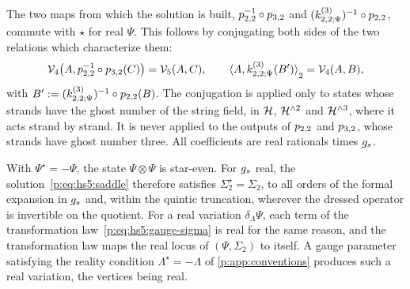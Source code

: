 The two maps from which the solution is built, $p_{2,2}^{-1} \circ p_{3,2}$ and $(\kin{2}{\Psi}{3})^{-1} \circ \sprod{2}{2}$, commute with $\star$ for real $\Psi$.
This follows by conjugating both sides of the two relations which characterize them:
\begin{equation}
\vertex{4}\big( A, \sprod{2}{2}^{-1} \circ \sprod{3}{2}(C) \big)
  = \vertex{5}(A, C),
\qquad
\pair[2]{A}{\kin{2}{\Psi}{3}(B')}
  = \vertex{4}(A, B),
\end{equation}
with $B' := (\kin{2}{\Psi}{3})^{-1} \circ \sprod{2}{2}(B)$.
The conjugation is applied only to states whose strands have the ghost number of the string field, in $\mathcal{H}$, $\mathcal{H}^{\wedge 2}$ and $\mathcal{H}^{\wedge 3}$, where it acts strand by strand.
It is never applied to the outputs of $p_{2,2}$ and $p_{3,2}$, whose strands have ghost number three.
All coefficients are real rationals times $g_s$.

With $\Psi^\star = - \Psi$, the state $\Psi \otimes \Psi$ is star-even.
For $g_s$ real, the solution~\eqref{p:eq:hs5:saddle} therefore satisfies $\Sigma_2^\star = \Sigma_2$, to all orders of the formal expansion in $g_s$ and, within the quintic truncation, wherever the dressed operator is invertible on the quotient.
For a real variation $\delta_\Lambda \Psi$, each term of the transformation law~\eqref{p:eq:hs5:gauge-sigma} is real for the same reason, and the transformation law maps the real locus of $(\Psi, \Sigma_2)$ to itself.
A gauge parameter satisfying the reality condition $\Lambda^\star = - \Lambda$ of \cref{p:app:conventions} produces such a real variation, the vertices being real.
